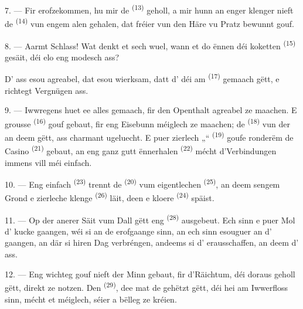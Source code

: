 7. --- Fir erofzekommen, hu mir de  \textsuperscript{(13)}
geholl, a mir hunn an enger klenger  nieft de 
\textsuperscript{(14)} vun engem alen  gehalen, dat fréier vun
den Häre vu Pratz bewunnt gouf.

8. --- Aarmt Schlass! Wat denkt et sech wuel, wann et do ënnen déi koketten
 \textsuperscript{(15)} gesäit, déi elo eng modesch
 ass?

D' ass esou agreabel, dat  esou wierksam, datt
d' déi am  \textsuperscript{(17)} gemaach gëtt, e
richtegt Vergnügen ass.

\VUsaut{3.0mm}
\VUsaut{3.0mm}

9. --- Iwwregens huet ee alles gemaach, fir den Openthalt agreabel ze maachen. E
grousse  \textsuperscript{(16)} gouf gebaut, fir eng Eisebunn
méiglech ze maachen; de  \textsuperscript{(18)} vun der
 an deem  gëtt, ass charmant ugeluecht. E
puer zierlech „“ \textsuperscript{(19)} goufe ronderëm de Casino
\textsuperscript{(21)} gebaut, an eng ganz gutt ënnerhalen 
\textsuperscript{(22)} mécht d'Verbindungen immens vill méi einfach.

10. --- Eng einfach  \textsuperscript{(23)} trennt de
 \textsuperscript{(20)} vum eigentlechen 
\textsuperscript{(25)}, an deem sengem Grond e zierleche klenge 
\textsuperscript{(26)} läit, deen e kloere  \textsuperscript{(24)}
späist.

11. --- Op der anerer Säit vum Dall gëtt eng  \textsuperscript{(28)}
ausgebeut. Ech sinn e puer Mol d' kucke gaangen, wéi si an de
 erofgaange sinn, an ech sinn esouguer an d'
gaangen, an där si hiren Dag verbréngen, andeems si d' erausschaffen,
an deem d' ass.

12. --- Eng wichteg  gouf nieft der Minn gebaut, fir d'Räichtum,
déi doraus geholl gëtt, direkt ze notzen. Den 
\textsuperscript{(29)}, dee mat de  gehëtzt gëtt, déi hei am
Iwwerfloss sinn, mécht et méiglech, séier a bëlleg  ze kréien.


